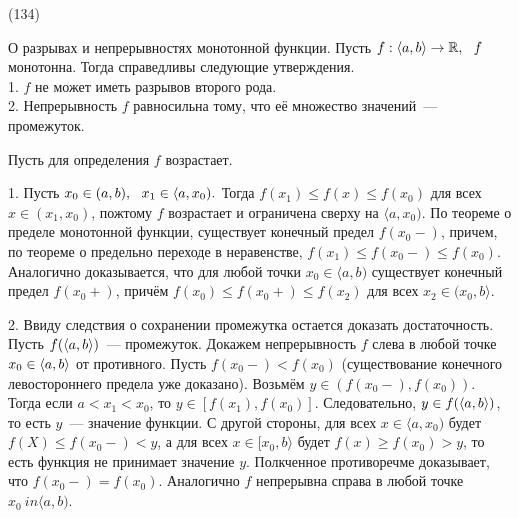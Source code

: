 (134)

\T \q О разрывах и непрерывностях монотонной функции. Пусть $f: \langle a, b \rangle \to \mathbb{R},\ \  f$ монотонна. Тогда справедливы следующие утверждения.\\
1. $f$ не может иметь разрывов второго рода.\\
2. Непрерывность $f$ равносильна тому, что её множество значений~--- промежуток.

\D Пусть для определения $f$ возрастает.

1. Пусть $x_0 \in (a, b),\ \  x_1 \in \langle a, x_0).$ Тогда $f(x_1) \le f(x) \le f(x_0)$ для всех $x \in (x_1, x_0)$, пожтому $f$ возрастает и ограничена сверху на $\langle a, x_0)$. По теореме о пределе монотонной функции, существует конечный предел $f(x_0-)$, причем, по теореме о предельно переходе в неравенстве, $f(x_1) \le f(x_0-) \le f(x_0)$. Аналогично доказывается, что для любой точки $x_0 \in \langle a, b)$ существует конечный предел $f(x_0+)$, причём $f(x_0) \le f(x_0+) \le f(x_2)$ для всех $x_2 \in (x_0, b\rangle$.

2. Ввиду следствия о сохранении промежутка остается доказать достаточность. Пусть $f(\langle a, b \rangle)$~--- промежуток. Докажем непрерывность $f$ слева в любой точке $x_0 \in \langle a, b \rangle$ от противного. Пусть $f(x_0-) < f(x_0)$ (существование конечного левостороннего предела уже доказано). Возьмём $y \in (f(x_0-), f(x_0))$. Тогда если $a < x_1 < x_0$, то $y \in [f(x_1), f(x_0)]$. Следовательно, $y \in f(\langle a, b \rangle)$, то есть $y$~--- значение функции. С другой стороны, для всех $x \in \langle a, x_0)$ будет $f(X) \le f(x_0-)< y$, а для всех $x \in [x_0, b\rangle$ будет $f(x) \ge f(x_0) > y$, то есть функция не принимает значение $y$. Полкченное противоречме доказывает, что $f(x_0-) = f(x_0)$. Аналогично $f$ непрерывна справа в любой точке $x_0\ in \langle a, b)$.